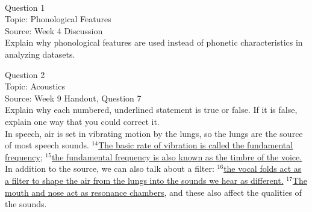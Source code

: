 \documentclass[12pt]{article}
\begin{document}
\newpage

\begin{center}
\textbf{{\color{red}{\HUGE END OF EXAM}}}\\

\end{center}
\newpage

\begin{center}
\textbf{{\color{blue}{\HUGE START OF EXAM\\}}}

\textbf{{\color{blue}{\HUGE Student ID: 16922\\}}}

\textbf{{\color{blue}{\HUGE 4:50\\}}}

\end{center}
\newpage

{\large Question 1}\\

Topic: Phonological Features\\
Source: Week 4 Discussion\\

Explain why phonological features are used instead of phonetic characteristics in analyzing datasets.\\


\newpage

{\large Question 2}\\

Topic: Acoustics\\
Source: Week 9 Handout, Question 7\\

Explain why each numbered, underlined statement is true or false. If it is false, explain one way that you could correct it.\\

In speech, air is set in vibrating motion by the lungs, so the lungs are the source of most speech sounds. $^{14}$\ul{The basic rate of vibration is called the fundamental frequency}; $^{15}$\ul{the fundamental frequency is also known as the timbre of the voice.} In addition to the source, we can also talk about a filter: $^{16}$\ul{the vocal folds act as a filter to shape the air from the lungs into the sounds we hear as different.} $^{17}$\ul{The mouth and nose act as resonance chambers}, and these also affect the qualities of the sounds.


\newpage

\begin{center}
\textbf{{\color{red}{\HUGE END OF EXAM}}}\\

\end{center}
\newpage
\end{document}
